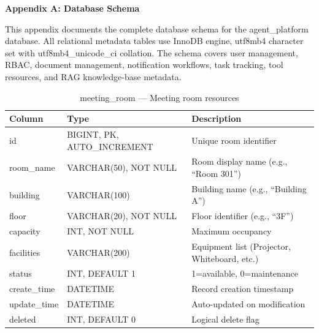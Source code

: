 \begin{center}
{\fontsize{16}{19}\selectfont\textbf{Appendix A: Database Schema}}
\end{center}

\vspace{3mm}

This appendix documents the complete database schema for the agent\_platform database. All relational metadata tables use InnoDB engine, utf8mb4 character set with utf8mb4\_unicode\_ci collation. The schema covers user management, RBAC, document management, notification workflows, task tracking, tool resources, and RAG knowledge-base metadata.

\vspace{4mm}

\newcommand{\schematableheader}{
\toprule
\textbf{Column} & \textbf{Type} & \textbf{Description} \\
\midrule
}

\begin{table}[H]
\small\singlespacing
\centering
\caption{meeting\_room --- Meeting room resources}
\label{tab:schema-meeting-room}
\vspace{2mm}

\begin{tabular}{@{}p{3cm}p{3.5cm}p{\dimexpr\textwidth-6.5cm-4\tabcolsep\relax}@{}}
\schematableheader
id          & BIGINT, PK, AUTO\_INCREMENT & Unique room identifier \\
room\_name  & VARCHAR(50), NOT NULL      & Room display name (e.g., ``Room 301'') \\
building    & VARCHAR(100)               & Building name (e.g., ``Building A'') \\
floor       & VARCHAR(20), NOT NULL      & Floor identifier (e.g., ``3F'') \\
capacity    & INT, NOT NULL              & Maximum occupancy \\
facilities  & VARCHAR(200)               & Equipment list (Projector, Whiteboard, etc.) \\
status      & INT, DEFAULT 1             & 1=available, 0=maintenance \\
create\_time & DATETIME                  & Record creation timestamp \\
update\_time & DATETIME                  & Auto-updated on modification \\
deleted     & INT, DEFAULT 0             & Logical delete flag \\
\bottomrule
\end{tabular}
\end{table}

